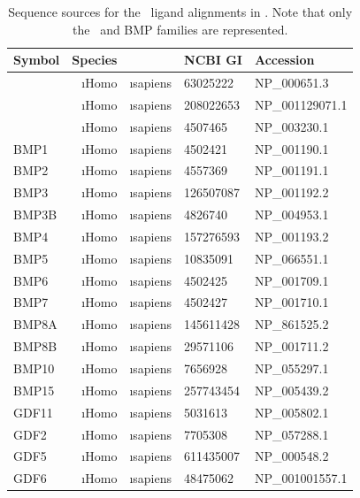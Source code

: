     \begin{table}[!bt]
    \centering
	\footnotesize
    \caption[List of \tgfbsf\ ligands]{ Sequence sources for the 
    \tgfbsf\ ligand alignments in . Note that only the 
    \tgf\ and BMP families are represented.}
    \label{table:pathways:methods:tgfbLigand}
    \begin{tabular}{lrlll}
    \hline
    Symbol & Species & & NCBI GI & Accession \\ \hline
    \tgf 1    & \i{Homo}       & \i{sapiens} & 63025222  & NP\_000651.3    \\
    \tgf 2    & \i{Homo}       & \i{sapiens} & 208022653 & NP\_001129071.1 \\
    \tgf 3    & \i{Homo}       & \i{sapiens} & 4507465   & NP\_003230.1 \\
    BMP1      & \i{Homo}       & \i{sapiens} & 4502421   & NP\_001190.1 \\
    BMP2      & \i{Homo}       & \i{sapiens} & 4557369   & NP\_001191.1    \\
    BMP3      & \i{Homo}       & \i{sapiens} & 126507087 & NP\_001192.2 \\
    BMP3B     & \i{Homo}       & \i{sapiens} & 4826740   & NP\_004953.1 \\
    BMP4      & \i{Homo}       & \i{sapiens} & 157276593 & NP\_001193.2    \\
    BMP5      & \i{Homo}       & \i{sapiens} & 10835091  & NP\_066551.1 \\
    BMP6      & \i{Homo}       & \i{sapiens} & 4502425   & NP\_001709.1 \\
    BMP7      & \i{Homo}       & \i{sapiens} & 4502427   & NP\_001710.1 \\
    BMP8A     & \i{Homo}       & \i{sapiens} & 145611428 & NP\_861525.2 \\
    BMP8B     & \i{Homo}       & \i{sapiens} & 29571106  & NP\_001711.2 \\
    BMP10     & \i{Homo}       & \i{sapiens} & 7656928   & NP\_055297.1 \\
    BMP15     & \i{Homo}       & \i{sapiens} & 257743454 & NP\_005439.2 \\
    GDF11     & \i{Homo}       & \i{sapiens} & 5031613   & NP\_005802.1 \\
    GDF2      & \i{Homo}       & \i{sapiens} & 7705308   & NP\_057288.1 \\
    GDF5      & \i{Homo}       & \i{sapiens} & 611435007 & NP\_000548.2 \\
    GDF6      & \i{Homo}       & \i{sapiens} & 48475062  & NP\_001001557.1 \\

\end{tabular}
\end{table}
